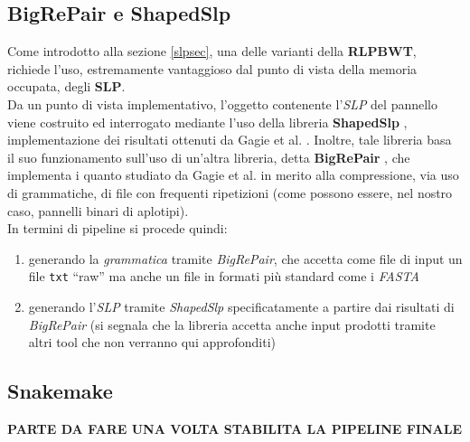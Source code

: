 \subsection{BigRePair e ShapedSlp}
\label{subslp}
Come introdotto alla sezione \ref{slpsec}, una delle varianti della
\textbf{RLPBWT}, richiede l'uso, estremamente vantaggioso dal punto di vista
della memoria occupata, degli \textbf{SLP}.\\
Da un punto di vista implementativo, l'oggetto contenente l'\textit{SLP} del
pannello viene costruito ed interrogato mediante l'uso della libreria
\textbf{ShapedSlp} \cite{shapedslp}, implementazione dei risultati ottenuti da
Gagie et al. \cite{slpgagie}. Inoltre, tale libreria basa il suo funzionamento
sull'uso di un'altra libreria, detta \textbf{BigRePair} \cite{bigrepair}, che
implementa i quanto studiato da Gagie et al. \cite{rpair} in merito alla
compressione, via uso di grammatiche, di file con frequenti ripetizioni (come
possono essere, nel nostro caso, pannelli binari di aplotipi).\\
In termini di pipeline si procede quindi:
\begin{enumerate}
  \item generando la \textit{grammatica} tramite \textit{BigRePair}, che accetta
  come file di input un file \texttt{txt} ``raw'' ma anche un file in formati
  più standard come i \textit{FASTA}
  \item generando l'\textit{SLP} tramite \textit{ShapedSlp} specificatamente a
  partire dai risultati di \textit{BigRePair} (si segnala che la libreria
  accetta anche input prodotti tramite altri tool che non verranno qui
  approfonditi) 
\end{enumerate}

\subsection{Snakemake}
\textbf{PARTE DA FARE UNA VOLTA STABILITA LA PIPELINE FINALE}